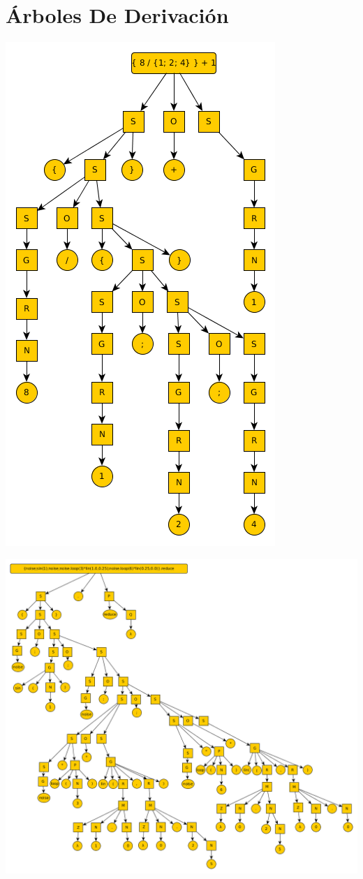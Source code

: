 \documentclass[a4paper,titlepage,10pt]{article}
\begin{document}
\section{Árboles De Derivación}
\centerline{\includegraphics[scale=0.7]{arbolDerivacion2.png}}   

\centerline{\includegraphics[scale=0.5]{arbolDerivacion.png}}   
\end{document}
